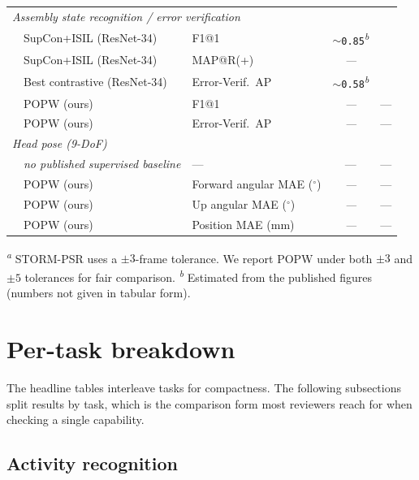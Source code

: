 \documentclass[11pt,a4paper]{article}
\newcommand{\popw}{POPW}
\newcommand{\todo}{\textit{---}}              %
\newcommand{\popwres}{\todo}                  %
\newcommand{\sym}[1]{\textsuperscript{\textit{#1}}}
\begin{document}
\begin{table}[!htbp]
\begin{tabular}{l l l c c}
\midrule
\multicolumn{5}{l}{\textit{Assembly state recognition / error verification}} \\
& SupCon+ISIL (ResNet-34)   & F1@1           & \texttt{$\sim$0.85}\sym{b} & \cite{schoonbeek2024supcon} \\
& SupCon+ISIL (ResNet-34)   & MAP@R(+)       & \todo & \cite{schoonbeek2024supcon} \\
& Best contrastive (ResNet-34) & Error-Verif.\ AP & \texttt{$\sim$0.58}\sym{b} & \cite{lehman2024statediffnet} \\
& \popw{} (ours)            & F1@1           & \popwres & --- \\
& \popw{} (ours)            & Error-Verif.\ AP & \popwres & --- \\
\midrule
\multicolumn{5}{l}{\textit{Head pose (9-DoF)}} \\
& \textit{no published supervised baseline} & --- & --- & --- \\
& \popw{} (ours)            & Forward angular MAE ($^\circ$)  & \popwres & --- \\
& \popw{} (ours)            & Up angular MAE ($^\circ$)       & \popwres & --- \\
& \popw{} (ours)            & Position MAE (mm)               & \popwres & --- \\
\bottomrule
\end{tabular}

\vspace{0.4em}
\footnotesize
\sym{a} STORM-PSR uses a $\pm 3$-frame tolerance. We report \popw{} under both
$\pm 3$ and $\pm 5$ tolerances for fair comparison.
\sym{b} Estimated from the published figures (numbers not given in tabular form).
\end{table}

\FloatBarrier
\section{Per-task breakdown}
\label{sec:per-task}

The headline tables interleave tasks for compactness. The following
subsections split results by task, which is the comparison form most
reviewers reach for when checking a single capability.

\subsection{Activity recognition}
\label{sec:activity-breakdown}
\end{document}
